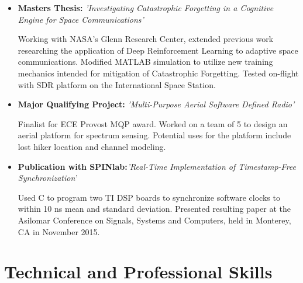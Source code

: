 \documentclass[11pt,a4paper,sans]{moderncv}        %
\begin{document}
\begin{itemize}[label={}]
\item{\textbf{Masters Thesis:} \textit{'Investigating Catastrophic Forgetting in a Cognitive Engine for Space Communications'}


\small{Working with NASA's Glenn Research Center, extended previous work researching the application of Deep Reinforcement Learning to adaptive space communications. Modified MATLAB simulation to utilize new training mechanics intended for mitigation of Catastrophic Forgetting. Tested on-flight with SDR platform on the International Space Station.}}

\item{\textbf{Major Qualifying Project:} \textit{'Multi-Purpose Aerial Software Defined Radio'}


\small{Finalist for ECE Provost MQP award. Worked on a team of 5 to design an aerial platform for spectrum sensing. Potential uses for the platform include lost hiker location and channel modeling. }}

\iffalse %
\item{\textbf{Interactive Qualifying Project:} \textit{'Evaluating Smart City Development in Kowloon East'}


\small{Worked on a team of 4 to evaluate the modernization of a district of Hong Kong, focusing on ease of pedestrian travel within the region. Presented to the government office responsible for development.}}
\fi %

\item{\textbf{Publication with SPINlab:}\textit{'Real-Time Implementation of Timestamp-Free Synchronization'}


\small{Used C to program two TI DSP boards to synchronize software clocks to within 10 ns mean and standard deviation. Presented resulting paper at the Asilomar Conference on Signals, Systems and Computers, held in Monterey, CA in November 2015.}}

\end{itemize}

\section{Technical and Professional Skills}
\end{document}
